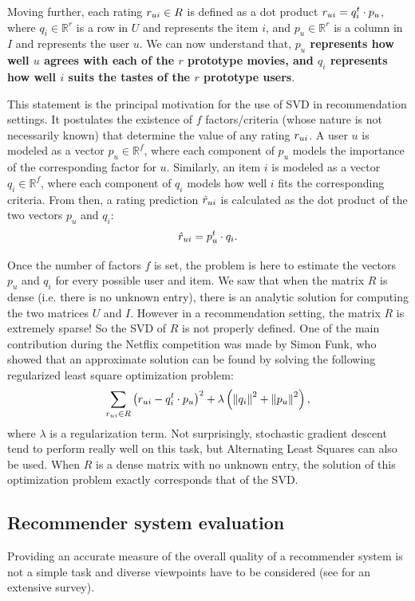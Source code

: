 Moving further, each rating $r_{ui} \in R$ is defined as a dot product $r_{ui} =
q_i^t \cdot p_u$, where $q_i \in \mathbb{R}^r$ is a row in $U$ and represents
the item $i$, and $p_u \in \mathbb{R}^r$ is a column in $I$ and represents the
user $u$. We can now understand that, \textbf{$p_u$ represents how well $u$
agrees with each of the $r$ prototype movies, and $q_i$ represents how well $i$
suits the tastes of the $r$ prototype users}.

This statement is the principal motivation for the use of SVD in recommendation
settings. It postulates the existence of $f$ factors/criteria (whose nature is
not necessarily known) that determine the value of any rating $r_{ui}$.  A user
$u$ is modeled as a vector $p_u \in \mathbb{R}^f$, where each component of
$p_u$ models the importance of the corresponding factor for $u$.  Similarly, an
item $i$ is modeled as a vector $q_i \in \mathbb{R}^f$, where each component of
$q_i$ models how well $i$ fits the corresponding criteria.  From then, a rating
prediction $\hat{r}_{ui}$ is calculated as the dot product of the two vectors $p_u$
and $q_i$:
$$\hat{r}_{ui} = p_u^t \cdot q_i.$$

Once the number of factors $f$ is set, the problem is here to estimate the
vectors $p_u$ and $q_i$ for every possible user and item. We saw that when the
matrix $R$ is dense (i.e. there is no unknown entry), there is an analytic
solution for computing the two matrices $U$ and $I$. However in a
recommendation setting, the matrix $R$ is extremely sparse! So the SVD of $R$
is not properly defined. One of the main contribution during the Netflix
competition was made by Simon Funk, who showed that an approximate solution can
be found by solving the following regularized least square optimization
problem:
$$
\sum_{r_{ui} \in R} \left(r_{ui} - q_i^t \cdot p_u \right)^2 +
\lambda\left({\left\lVert q_i\right\rVert}_{}^2 + {\left\lVert p_u\right\rVert}_{}^2\right),
$$
where $\lambda$ is a regularization term. Not surprisingly, stochastic gradient
descent tend to perform really well on this task, but Alternating Least Squares
can also be used. When $R$ is a dense matrix with no unknown entry, the
solution of this optimization problem exactly corresponds that of the SVD.


\subsection{Recommender system evaluation}
\label{SEC:Recommender_system_evaluation}
Providing an accurate measure of the overall quality of a recommender system is
not a simple task and diverse viewpoints have to be considered (see \cite[Ch.
??]{RecoSystemHandbook} for an extensive survey).

